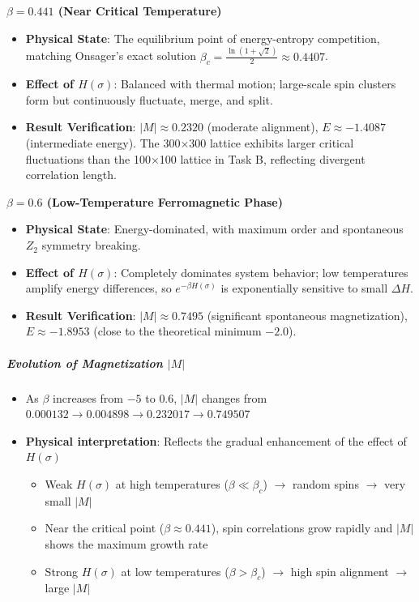 \documentclass[11pt]{article}
\providecommand{\tightlist}{%
      \setlength{\itemsep}{0pt}\setlength{\parskip}{0pt}}
\begin{document}
\textbf{\(\beta = 0.441\) (Near Critical Temperature)}

\begin{itemize}
\tightlist
\item
  \textbf{Physical State}: The equilibrium point of energy-entropy
  competition, matching Onsager's exact solution
  \(\beta_c = \frac{\ln(1+\sqrt{2})}{2} \approx 0.4407\).
\item
  \textbf{Effect of \(H(\sigma)\)}: Balanced with thermal motion;
  large-scale spin clusters form but continuously fluctuate, merge, and
  split.
\item
  \textbf{Result Verification}: \(|M| \approx 0.2320\) (moderate
  alignment), \(E \approx -1.4087\) (intermediate energy). The 300×300
  lattice exhibits larger critical fluctuations than the 100×100 lattice
  in Task B, reflecting divergent correlation length.
\end{itemize}

\textbf{\(\beta = 0.6\) (Low-Temperature Ferromagnetic Phase)}

\begin{itemize}
\tightlist
\item
  \textbf{Physical State}: Energy-dominated, with maximum order and
  spontaneous \(Z_2\) symmetry breaking.
\item
  \textbf{Effect of \(H(\sigma)\)}: Completely dominates system
  behavior; low temperatures amplify energy differences, so
  \(e^{-\beta H(\sigma)}\) is exponentially sensitive to small
  \(\Delta H\).
\item
  \textbf{Result Verification}: \(|M| \approx 0.7495\) (significant
  spontaneous magnetization), \(E \approx -1.8953\) (close to the
  theoretical minimum \(-2.0\)).
\end{itemize}

\subparagraph{\texorpdfstring{Evolution of Magnetization
\(|M|\)}{Evolution of Magnetization \textbar M\textbar{}}}\label{evolution-of-magnetization-m}

\begin{itemize}
\tightlist
\item
  As \(\beta\) increases from \(-5\) to \(0.6\), \(|M|\) changes from\\
  \(0.000132 \rightarrow 0.004898 \rightarrow 0.232017 \rightarrow 0.749507\)
\item
  \textbf{Physical interpretation}: Reflects the gradual enhancement of
  the effect of \(H(\sigma)\)

  \begin{itemize}
  \tightlist
  \item
    Weak \(H(\sigma)\) at high temperatures (\(\beta \ll \beta_c\))
    \(\rightarrow\) random spins \(\rightarrow\) very small \(|M|\)
  \item
    Near the critical point (\(\beta \approx 0.441\)), spin correlations
    grow rapidly and \(|M|\) shows the maximum growth rate
  \item
    Strong \(H(\sigma)\) at low temperatures (\(\beta > \beta_c\))
    \(\rightarrow\) high spin alignment \(\rightarrow\) large \(|M|\)
  \end{itemize}
\end{itemize}
\end{document}
